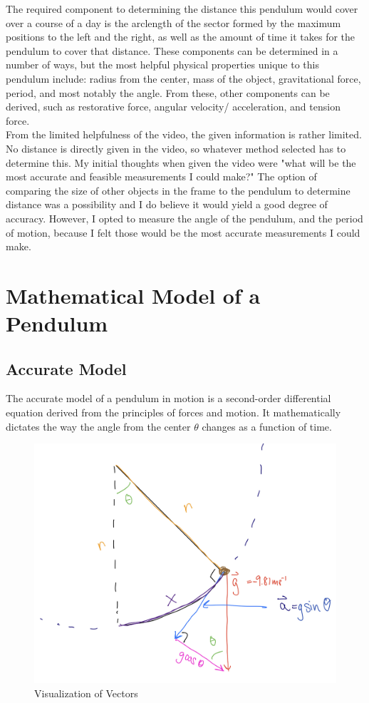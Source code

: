 \documentclass[11pt,a4paper]{article}
\begin{document}
The required component to determining the distance this pendulum would cover over a course of a day is the arclength of the sector formed by the maximum positions to the left and the right,  as well as the amount of time it takes for the pendulum to cover that distance.  These components can be determined in a number of ways,  but the most helpful physical properties unique to this pendulum include: radius from the center,  mass of the object,  gravitational force,  period,  and most notably the angle.  From these,  other components can be derived, such as restorative force,  angular velocity/ acceleration,  and tension force. \\
From the limited helpfulness of the video,  the given information is rather limited. No distance is directly given in the video,  so whatever method selected has to determine this.  My initial thoughts when given the video were "what will be the most accurate and feasible measurements I could make?" The option of comparing the size of other objects in the frame to the pendulum to determine distance was a possibility and I do believe it would yield a good degree of accuracy.  However,  I opted to measure the angle of the pendulum,  and the period of motion,  because I felt those would be the most accurate measurements I could make.
\section{Mathematical Model of a Pendulum}
\subsection{Accurate Model}
The accurate model of a pendulum in motion is a second-order differential equation derived from the principles of forces and motion.  It mathematically dictates the way the angle from the center $\theta$ changes as a function of time.
\begin{figure}[h]
\begin{center}
\includegraphics[scale=.45]{acceleration.jpeg} 
\caption{Visualization of Vectors}
\end{center}
\end{figure}
\end{document}
